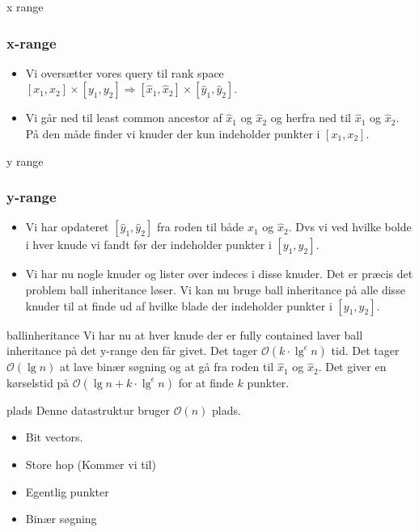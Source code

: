 \documentclass[pdf]{beamer}
\begin{document}
\begin{frame}{x range}
  \frametitle{x-range}
  \begin{itemize}
    \item Vi oversætter vores query til rank space $[x_1, x_2] \times [y_1, y_2] \Rightarrow [\hat{x}_1, \hat{x}_2] \times [\hat{y}_1, \hat{y}_2]$.
      \pause

    \item Vi går ned til least common ancestor af $\hat{x}_1$ og $\hat{x}_2$ og herfra ned til $\hat{x}_1$ og $\hat{x}_2$. På den måde finder vi knuder der kun indeholder punkter i $[x_1, x_2]$.
  \end{itemize}
\end{frame}

\begin{frame}{y range}
  \frametitle{y-range}
  \begin{itemize}
    \item Vi har opdateret $[\hat{y}_1, \hat{y}_2]$ fra roden til både $\hat{x}_1$ og $\hat{x}_2$. Dvs vi ved hvilke bolde i hver knude vi fandt før der indeholder punkter i $[y_1, y_2]$.
      \pause
    \item  Vi har nu nogle knuder og lister over indeces i disse knuder. Det er præcis det problem ball inheritance løser. Vi kan nu bruge ball inheritance på alle disse knuder til at finde ud af hvilke blade der indeholder punkter i $[y_1, y_2]$.
  \end{itemize}
\end{frame}

\begin{frame}{ballinheritance}
  Vi har nu at hver knude der er fully contained laver ball inheritance på det y-range den får givet. Det tager $\mathcal{O}(k\cdot\lg^\epsilon n)$ tid. Det tager $\mathcal{O}(\lg n)$ at lave binær søgning og at gå fra roden til $\hat{x}_1$ og $\hat{x}_2$.
  \pause
  Det giver en kørselstid på $\mathcal{O}(\lg n + k\cdot\lg^\epsilon n)$ for at finde $k$ punkter.
\end{frame}

\begin{frame}{plads}
  Denne datastruktur bruger $\mathcal{O}(n)$ plads.
  \begin{itemize}
    \item Bit vectors.
      \pause
    \item Store hop (Kommer vi til)
      \pause
    \item Egentlig punkter
      \pause
    \item Binær søgning
  \end{itemize}
\end{frame}
\end{document}
